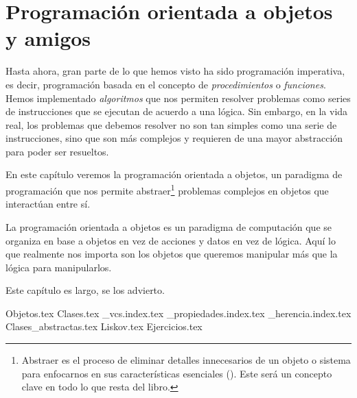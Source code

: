 \chapter{Programación orientada a objetos y amigos}
  \begin{refsection}
    Hasta ahora, gran parte de lo que hemos visto ha sido programación imperativa, es decir,
    programación basada en el concepto de \textit{procedimientos} o \textit{funciones}.
    Hemos implementado \textit{algoritmos} que nos permiten resolver problemas como series de
    instrucciones que se ejecutan de acuerdo a una lógica.
    Sin embargo, en la vida real, los problemas que debemos resolver no son tan simples como
    una serie de instrucciones, sino que son más complejos y requieren de una mayor abstracción
    para poder ser resueltos.

    En este capítulo veremos la programación orientada a objetos, un paradigma de programación
    que nos permite abstraer\footnote{
      Abstraer es el proceso de eliminar detalles innecesarios de un objeto o sistema para 
      enfocarnos en sus características esenciales (\cite{ObjectorientedProgramming2023}).
      Este será un concepto clave en todo lo que resta del libro.
    } problemas complejos en objetos que interactúan entre sí.

    \begin{defaultbox}
      La programación orientada a objetos es un paradigma de computación que se organiza en base a 
      objetos en vez de acciones y datos en vez de lógica.
      Aquí lo que realmente nos importa son los objetos que queremos manipular más que la lógica para
      manipularlos.
    \end{defaultbox}

    Este capítulo es largo, se los advierto.


    {Objetos.tex}
    {Clases.tex}
    {_vcs.index.tex}
    {_propiedades.index.tex}
    {_herencia.index.tex}
    {Clases_abstractas.tex}
    {Liskov.tex}
    {Ejercicios.tex}
    \nocite{*}
    \printbibliography[keyword=oop]
  \end{refsection}